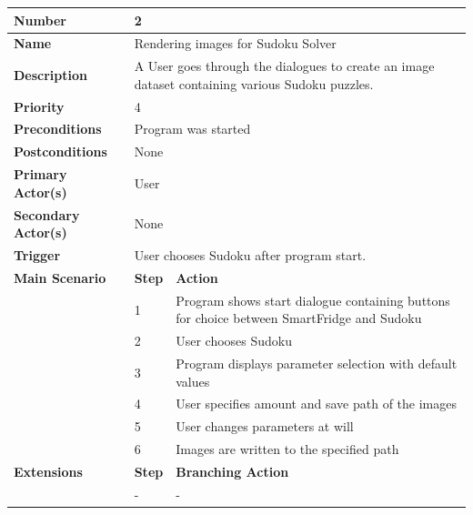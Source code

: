 \documentclass[a4paper,12pt]{article}
\begin{document}
\begin{tabularx}{\linewidth}{|l|l|X|}
\hline
\textbf{Number} & \multicolumn{2}{l|}{2} \\
\hline
\textbf{Name} & \multicolumn{2}{l|}{Rendering images for Sudoku Solver} \\
\hline
\textbf{Description} &  \multicolumn{2}{X|}{A User goes through the dialogues to create an image dataset containing various Sudoku puzzles.} \\
\hline
\textbf{Priority} & \multicolumn{2}{l|}{4} \\
\hline
\textbf{Preconditions} & \multicolumn{2}{l|}{Program was started} \\
\hline
\textbf{Postconditions} & \multicolumn{2}{l|}{None} \\
\hline
\textbf{Primary Actor(s)} & \multicolumn{2}{l|}{User} \\
\hline
\textbf{Secondary Actor(s)} & \multicolumn{2}{l|}{None} \\
\hline
\textbf{Trigger} & \multicolumn{2}{l|}{User chooses Sudoku after program start.} \\
\hline
\textbf{Main Scenario} & \textbf{Step} & \textbf{Action} \\
\hline
 & 1 & Program shows start dialogue containing buttons for choice between SmartFridge and Sudoku\\
\cline{2-3}
 & 2 & User chooses Sudoku \\
\cline{2-3}
 & 3 & Program displays parameter selection with default values\\
\cline{2-3}
 & 4 & User specifies amount and save path of the images \\
\cline{2-3}
 & 5 & User changes parameters at will \\
\cline{2-3}
 & 6 & Images are written to the specified path \\
\hline
\textbf{Extensions} & \textbf{Step} & \textbf{Branching Action} \\
\hline
& - & - \\
\hline
\end{tabularx}
 \\
 \\
 \\
\end{document}
